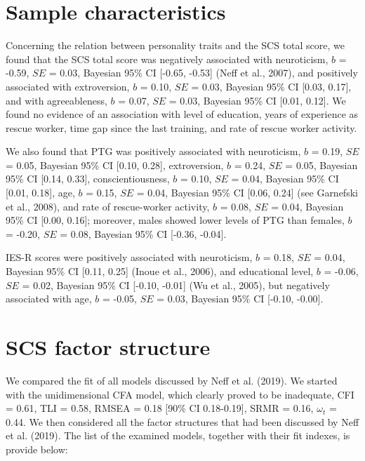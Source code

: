 \clearpage
\makeatletter
\efloat@restorefloats
\makeatother


\begin{appendix}
\hypertarget{sample-characteristics}{%
\section{Sample characteristics}\label{sample-characteristics}}

Concerning the relation between personality traits and the SCS total
score, we found that the SCS total score was negatively associated with
neuroticism, \(b\) = -0.59, \(SE\) = 0.03, Bayesian 95\% CI {[}-0.65,
-0.53{]} (Neff et al., 2007), and positively associated with
extroversion, \(b\) = 0.10, \(SE\) = 0.03, Bayesian 95\% CI {[}0.03,
0.17{]}, and with agreeableness, \(b\) = 0.07, \(SE\) = 0.03, Bayesian
95\% CI {[}0.01, 0.12{]}. We found no evidence of an association with
level of education, years of experience as rescue worker, time gap since
the last training, and rate of rescue worker activity.

We also found that PTG was positively associated with neuroticism, \(b\)
= 0.19, \(SE\) = 0.05, Bayesian 95\% CI {[}0.10, 0.28{]}, extroversion,
\(b\) = 0.24, \(SE\) = 0.05, Bayesian 95\% CI {[}0.14, 0.33{]},
conscientiousness, \(b\) = 0.10, \(SE\) = 0.04, Bayesian 95\% CI
{[}0.01, 0.18{]}, age, \(b\) = 0.15, \(SE\) = 0.04, Bayesian 95\% CI
{[}0.06, 0.24{]} (see Garnefski et al., 2008), and rate of rescue-worker
activity, \(b\) = 0.08, \(SE\) = 0.04, Bayesian 95\% CI {[}0.00,
0.16{]}; moreover, males showed lower levels of PTG than females, \(b\)
= -0.20, \(SE\) = 0.08, Bayesian 95\% CI {[}-0.36, -0.04{]}.

IES-R scores were positively associated with neuroticism, \(b\) = 0.18,
\(SE\) = 0.04, Bayesian 95\% CI {[}0.11, 0.25{]} (Inoue et al., 2006),
and educational level, \(b\) = -0.06, \(SE\) = 0.02, Bayesian 95\% CI
{[}-0.10, -0.01{]} (Wu et al., 2005), but negatively associated with
age, \(b\) = -0.05, \(SE\) = 0.03, Bayesian 95\% CI {[}-0.10, -0.00{]}.

\newpage

\hypertarget{scs-factor-structure}{%
\section{SCS factor structure}\label{scs-factor-structure}}

We compared the fit of all models discussed by Neff et al. (2019). We
started with the unidimensional CFA model, which clearly proved to be
inadequate, CFI = 0.61, TLI = 0.58, RMSEA = 0.18 {[}90\% CI
0.18-0.19{]}, SRMR = 0.16, \(\omega_t\) = 0.44. We then considered all
the factor structures that had been discussed by Neff et al. (2019). The
list of the examined models, together with their fit indexes, is provide
below:


\end{appendix}

